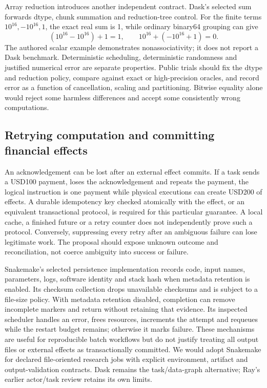 Array reduction introduces another independent contract. Dask's selected sum forwards dtype, chunk summation and reduction-tree control. For the finite terms $10^{16},-10^{16},1$, the exact real sum is 1, while ordinary binary64 grouping can give
\[
 (10^{16}-10^{16})+1=1,\qquad
 10^{16}+(-10^{16}+1)=0.
\]
The authored scalar example demonstrates nonassociativity; it does not report a Dask benchmark. Deterministic scheduling, deterministic randomness and justified numerical error are separate properties. Public trials should fix the dtype and reduction policy, compare against exact or high-precision oracles, and record error as a function of cancellation, scaling and partitioning. Bitwise equality alone would reject some harmless differences and accept some consistently wrong computations.\citep{exec25_dww_dask,exec25_dww_choice}

\subsection{Retrying computation and committing financial effects}

An acknowledgement can be lost after an external effect commits. If a task sends a USD100 payment, loses the acknowledgement and repeats the payment, the logical instruction is one payment while physical executions can create USD200 of effects. A durable idempotency key checked atomically with the effect, or an equivalent transactional protocol, is required for this particular guarantee. A local cache, a finished future or a retry counter does not independently prove such a protocol. Conversely, suppressing every retry after an ambiguous failure can lose legitimate work. The proposal should expose unknown outcome and reconciliation, not coerce ambiguity into success or failure.\citep{exec25_dww_choice}

Snakemake's selected persistence implementation records code, input names, parameters, logs, software identity and stack hash when metadata retention is enabled. Its checksum collection drops unavailable checksums and is subject to a file-size policy. With metadata retention disabled, completion can remove incomplete markers and return without retaining that evidence. Its inspected scheduler handles an error, frees resources, increments the attempt and requeues while the restart budget remains; otherwise it marks failure. These mechanisms are useful for reproducible batch workflows but do not justify treating all output files or external effects as transactionally committed. We would adopt Snakemake for declared file-oriented research jobs with explicit environment, artifact and output-validation contracts. Dask remains the task/data-graph alternative; Ray's earlier actor/task review retains its own limits.\citep{exec25_dww_snakemake,exec24_ray_sources,exec24_ray_contract}

